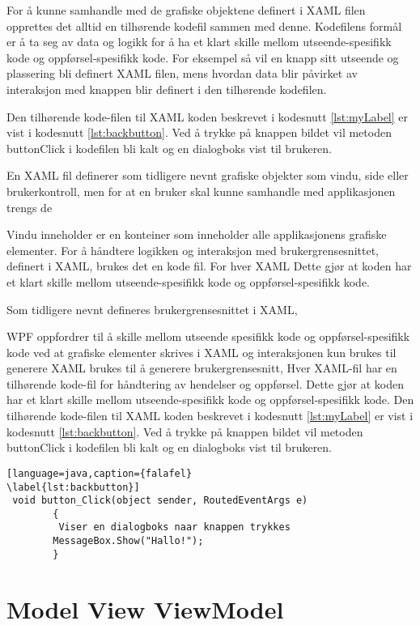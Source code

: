  
For å kunne samhandle med de grafiske objektene definert i XAML filen opprettes det alltid en tilhørende kodefil sammen med denne. Kodefilens formål er å ta seg av data og logikk for å ha et klart skille mellom utseende-spesifikk kode og oppførsel-spesifikk kode. For eksempel så vil en knapp sitt utseende og plassering bli definert XAML filen, mens hvordan data blir påvirket av interaksjon med knappen blir definert i den tilhørende kodefilen. 
 
 
Den tilhørende kode-filen til XAML koden beskrevet i kodesnutt \ref{lst:myLabel} er vist i kodesnutt \ref{lst:backbutton}. Ved å trykke på knappen bildet vil metoden button\textunderscore Click i kodefilen bli kalt og en dialogboks vist til brukeren. 
 
 
En XAML fil definerer som tidligere nevnt grafiske objekter som vindu, side eller brukerkontroll, men for at en bruker skal kunne samhandle med applikasjonen trengs de 
 
 
Vindu inneholder er en konteiner som inneholder alle applikasjonens grafiske elementer. For å håndtere logikken og interaksjon med brukergrensesnittet,  definert i XAML, brukes det en kode fil. For hver XAML   Dette gjør at koden har et klart skille mellom utseende-spesifikk kode og oppførsel-spesifikk kode. 
 
 
Som tidligere nevnt defineres brukergrensesnittet i XAML, 
 
 
WPF oppfordrer til å skille mellom utseende spesifikk kode og oppførsel-spesifikk kode ved at grafiske elementer skrives i XAML og interaksjonen  kun brukes til generere  
XAML brukes til å generere brukergrensesnitt,  
Hver XAML-fil har en tilhørende kode-fil for håndtering av hendelser og oppførsel. Dette gjør at koden har et klart skille mellom utseende-spesifikk kode og oppførsel-spesifikk kode. Den tilhørende kode-filen til XAML koden beskrevet i kodesnutt \ref{lst:myLabel} er vist i kodesnutt \ref{lst:backbutton}. Ved å trykke på knappen bildet vil metoden button\textunderscore Click i kodefilen bli kalt og en dialogboks vist til brukeren. 
 
 
\begin{lstlisting}[language=java,caption={falafel} 
\label{lst:backbutton}] 
 void button_Click(object sender, RoutedEventArgs e) 
        { 
         Viser en dialogboks naar knappen trykkes 
        MessageBox.Show("Hallo!"); 
        } 
\end{lstlisting} 
 
 
 
 
\section{Model View ViewModel} 
 
